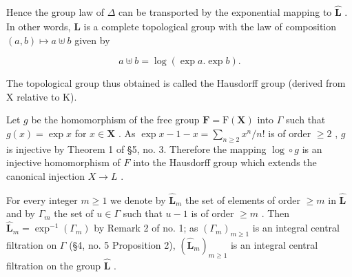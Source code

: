 Hence the group law of \(\Delta\) can be transported by the exponential mapping to \(\hat{\mathbf{L}}\) . In other words, \(\hat{\mathbf{L}}\) is a complete topological group with the law of composition \((a, b) \mapsto a \uplus b\) given by

\[
a \uplus b = \log (\exp a. \exp b).
\]

The topological group thus obtained is called the Hausdorff group (derived from X relative to K).

Let \(g\) be the homomorphism of the free group \(\mathbf{F} = \mathrm{F}(\mathbf{X})\) into \(\Gamma\) such that \(g(x) = \exp x\) for \(x \in \mathbf{X}\) . As \(\exp x - 1 - x = \sum_{n \geqslant 2} x^n / n!\) is of order \(\geqslant 2\) , \(g\) is injective by Theorem 1 of §5, no. 3. Therefore the mapping \(\log \circ g\) is an injective homomorphism of \(F\) into the Hausdorff group which extends the canonical injection \(X \to L\) .

For every integer \(m \geqslant 1\) we denote by \(\hat{\mathbf{L}}_m\) the set of elements of order \(\geqslant m\) in \(\hat{\mathbf{L}}\) and by \(\Gamma_m\) the set of \(u \in \Gamma\) such that \(u - 1\) is of order \(\geqslant m\) . Then \(\hat{\mathbf{L}}_m = \exp^{-1}(\Gamma_m)\) by Remark 2 of no. 1; as \((\Gamma_m)_{m \geqslant 1}\) is an integral central filtration on \(\Gamma\) (§4, no. 5 Proposition 2), \((\hat{\mathbf{L}}_m)_{m \geqslant 1}\) is an integral central filtration on the group \(\hat{\mathbf{L}}\) .

